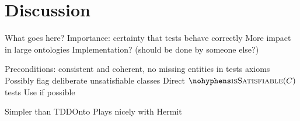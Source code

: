\documentclass[paper.tex]{subfiles}
\begin{document}
\section{Discussion}
\label{sec:discussion}

\begin{todos}
  \todo What goes here?
  \todo Importance: certainty that tests behave correctly
  \todo More impact in large ontologies
  \todo Implementation? (should be done by someone else?)
  \begin{todos}
    \todo Preconditions: consistent and coherent, no missing entities in tests axioms
    \todo Possibly flag deliberate unsatisfiable classes
    \todo Direct $\textproc{isSatisfiable}(C)$ tests
    \todo Use  if possible
  \end{todos}
  \todo Simpler than TDDOnto
  \todo Plays nicely with Hermit
\end{todos}
\end{document}
